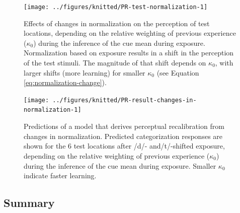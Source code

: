 \documentclass[
  11pt,
  man,floatsintext]{apa6}
\begin{document}
\begin{figure}

{\centering \texttt{[image: ../figures/knitted/PR-test-normalization-1]} 

}

\caption{Effects of changes in normalization on the perception of test locations, depending on the relative weighting of previous experience (\(\kappa_0\)) during the inference of the cue mean during exposure. Normalization based on exposure results in a shift in the perception of the test stimuli. The magnitude of that shift depends on \(\kappa_0\), with larger shifts (more learning) for smaller \(\kappa_0\) (see Equation \eqref{eq:normalization-change}).}\label{fig:PR-test-normalization}
\end{figure}



\begin{figure}

{\centering \texttt{[image: ../figures/knitted/PR-result-changes-in-normalization-1]} 

}

\caption{Predictions of a model that derives perceptual recalibration from changes in normalization. Predicted categorization responses are shown for the 6 test locations after /d/- and/t/-shifted exposure, depending on the relative weighting of previous experience (\(\kappa_0\)) during the inference of the cue mean during exposure. Smaller \(\kappa_0\) indicate faster learning.}\label{fig:PR-result-changes-in-normalization}
\end{figure}

\hypertarget{summary}{%
\subsection{Summary}\label{summary}}
\end{document}
